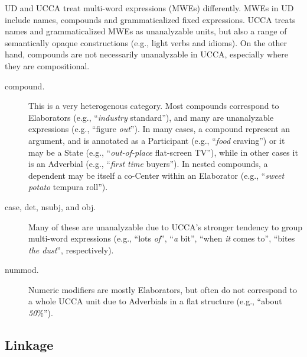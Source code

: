 \documentclass[11pt,a4paper]{article}
\begin{document}
UD and UCCA treat multi-word expressions (MWEs) differently.
MWEs in UD include names, compounds and grammaticalized fixed expressions.
UCCA treats names and grammaticalized MWEs as unanalyzable units,
but also a range of semantically opaque constructions
(e.g., light verbs and idioms).
On the other hand, compounds are not necessarily unanalyzable in UCCA,
especially where they are compositional.
\begin{description}
    \item[compound.]
    This is a very heterogenous category.
    Most compounds correspond to Elaborators (e.g., ``\textit{industry} standard''),
    and many are unanalyzable expressions (e.g., ``figure \textit{out}'').
    In many cases, a compound represent an argument,
    and is annotated as a Participant (e.g., ``\textit{food} craving'')
    or it may be a State (e.g., ``\textit{out-of-place} flat-screen TV''),
    while in other cases it is an Adverbial (e.g., ``\textit{first time} buyers'').
    In nested compounds, a dependent may be itself a co-Center
    within an Elaborator
    (e.g., ``\textit{sweet potato} tempura roll'').
    \item[case, det, nsubj, and obj.]
    Many of these are unanalyzable due to UCCA's stronger tendency to group
    multi-word expressions (e.g., ``lots \textit{of}'',
    ``\textit{a} bit'', ``when \textit{it} comes to'', ``bites \textit{the dust}'',
    respectively).
    \item[nummod.]
    Numeric modifiers are mostly Elaborators, but often do not correspond to a whole UCCA unit
    due to Adverbials in a flat structure (e.g., ``about \textit{50}\%'').
\end{description}

\subsection{Linkage}\label{sec:linkage}
\end{document}
